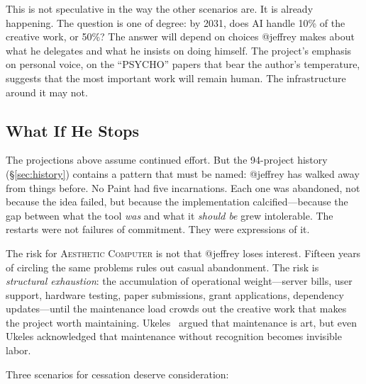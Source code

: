 \documentclass[10pt,letterpaper,twocolumn]{article}
\newcommand{\ac}{\textsc{Aesthetic Computer}}
\begin{document}
This is not speculative in the way the other scenarios are. It is already happening. The question is one of degree: by 2031, does AI handle 10\% of the creative work, or 50\%? The answer will depend on choices @jeffrey makes about what he delegates and what he insists on doing himself. The project's emphasis on personal voice, on the ``PSYCHO'' papers that bear the author's temperature, suggests that the most important work will remain human. The infrastructure around it may not.

\subsection{What If He Stops}
\label{sec:giveup}

The projections above assume continued effort. But the 94-project history (\S\ref{sec:history}) contains a pattern that must be named: @jeffrey has walked away from things before. No Paint had five incarnations. Each one was abandoned, not because the idea failed, but because the implementation calcified---because the gap between what the tool \emph{was} and what it \emph{should be} grew intolerable. The restarts were not failures of commitment. They were expressions of it.

The risk for \ac{} is not that @jeffrey loses interest. Fifteen years of circling the same problems rules out casual abandonment. The risk is \emph{structural exhaustion}: the accumulation of operational weight---server bills, user support, hardware testing, paper submissions, grant applications, dependency updates---until the maintenance load crowds out the creative work that makes the project worth maintaining. Ukeles~\citep{ukeles1969manifesto} argued that maintenance is art, but even Ukeles acknowledged that maintenance without recognition becomes invisible labor.

Three scenarios for cessation deserve consideration:
\end{document}

